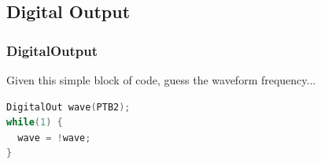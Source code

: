 \documentclass{beamer}
\begin{document}
\subsection{Digital Output}

\begin{frame}[fragile]
\frametitle{DigitalOutput}
Given this simple block of code, guess the waveform frequency...
\vspace{2px}
\begin{lstlisting}[language=C++,basicstyle=\ttfamily\tiny]
DigitalOut wave(PTB2);
while(1) {
  wave = !wave;
}
\end{lstlisting}
\begin{columns}[T]
\end{columns}
\end{frame}
\end{document}
